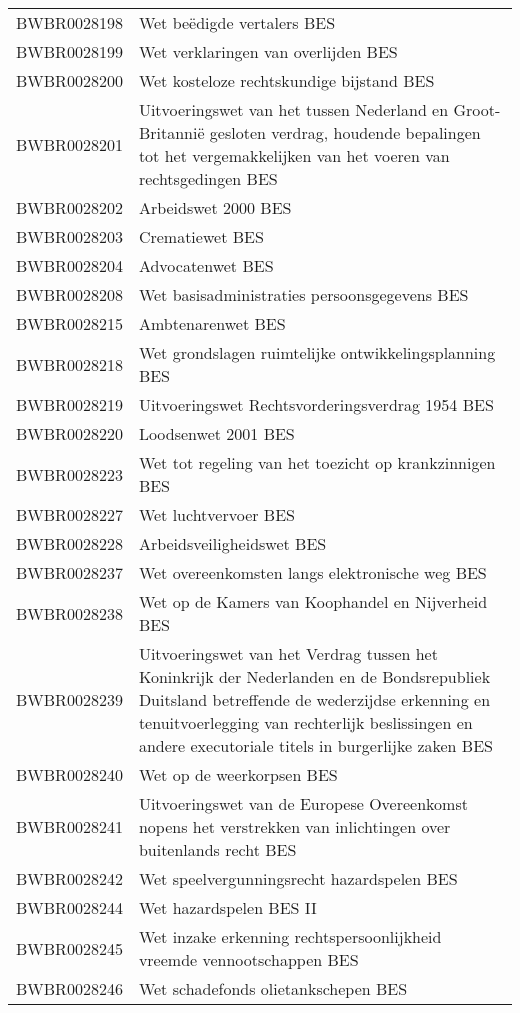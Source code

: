 \begin{longtable}{lp{}}
BWBR0028198 & Wet beëdigde vertalers BES \\
BWBR0028199 & Wet verklaringen van overlijden BES \\
BWBR0028200 & Wet kosteloze rechtskundige bijstand BES \\
BWBR0028201 & Uitvoeringswet van het tussen Nederland en Groot-Britannië gesloten verdrag, houdende bepalingen tot het vergemakkelijken van het voeren van rechtsgedingen BES \\
BWBR0028202 & Arbeidswet 2000 BES \\
BWBR0028203 & Crematiewet BES \\
BWBR0028204 & Advocatenwet BES \\
BWBR0028208 & Wet basisadministraties persoonsgegevens BES \\
BWBR0028215 & Ambtenarenwet BES \\
BWBR0028218 & Wet grondslagen ruimtelijke ontwikkelingsplanning BES \\
BWBR0028219 & Uitvoeringswet Rechtsvorderingsverdrag 1954 BES \\
BWBR0028220 & Loodsenwet 2001 BES \\
BWBR0028223 & Wet tot regeling van het toezicht op krankzinnigen BES \\
BWBR0028227 & Wet luchtvervoer BES \\
BWBR0028228 & Arbeidsveiligheidswet BES \\
BWBR0028237 & Wet overeenkomsten langs elektronische weg BES \\
BWBR0028238 & Wet op de Kamers van Koophandel en Nijverheid BES \\
BWBR0028239 & Uitvoeringswet van het Verdrag tussen het Koninkrijk der Nederlanden en de Bondsrepubliek Duitsland betreffende de wederzijdse erkenning en tenuitvoerlegging van rechterlijk beslissingen en andere executoriale titels in burgerlijke zaken BES \\
BWBR0028240 & Wet op de weerkorpsen BES \\
BWBR0028241 & Uitvoeringswet van de Europese Overeenkomst nopens het verstrekken van inlichtingen over buitenlands recht BES \\
BWBR0028242 & Wet speelvergunningsrecht hazardspelen BES \\
BWBR0028244 & Wet hazardspelen BES II \\
BWBR0028245 & Wet inzake erkenning rechtspersoonlijkheid vreemde vennootschappen BES \\
BWBR0028246 & Wet schadefonds olietankschepen BES \\

\end{longtable}
